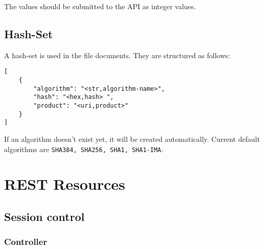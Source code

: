 \documentclass[10pt,a4paper]{scrartcl}
\begin{document}
The values should be submitted to the API as integer values.

\subsection{Hash-Set}

A hash-set is used in the file documents. They are structured as follows:

\begin{lstlisting}
[
	{
		"algorithm": "<str,algorithm-name>",
		"hash": "<hex,hash>	",
		"product": "<uri,product>"
	}
]
\end{lstlisting}

If an algorithm doesn't exist yet, it will be created automatically. Current
default algorithms are \texttt{SHA384, SHA256, SHA1, SHA1-IMA}.


\pagebreak


\section{REST Resources}

\subsection{Session control}

\subsubsection{Controller}
\end{document}
